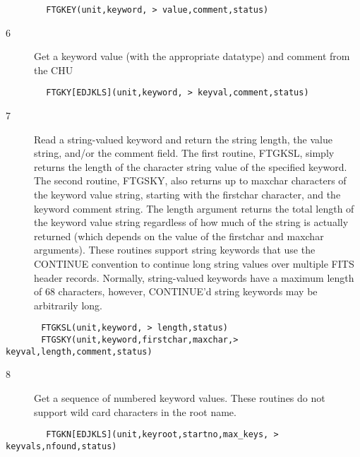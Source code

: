 \documentclass[11pt]{book}
\begin{document}
\begin{verbatim}
        FTGKEY(unit,keyword, > value,comment,status)
\end{verbatim}

\begin{description}
\item[6 ] Get a keyword value (with the appropriate datatype) and comment from
   the CHU
\end{description}

\begin{verbatim}
        FTGKY[EDJKLS](unit,keyword, > keyval,comment,status)
\end{verbatim}

\begin{description}
\item[7 ] Read a string-valued keyword and return the string length, the value string,
    and/or the comment field. The first routine, FTGKSL, simply
    returns the length of the character string value of the specified keyword.
    The second routine, FTGSKY, also returns up to maxchar characters
    of the keyword value string, starting with the firstchar character,
    and the keyword comment string.
    The length argument returns the total length of the keyword value string
    regardless of how much of the string is actually returned (which
    depends on the value of the firstchar and maxchar arguments).  These
    routines support string keywords that use the CONTINUE convention to
    continue long string values over multiple FITS header records.  Normally,
    string-valued keywords have a maximum length of 68 characters, however,
   CONTINUE'd string keywords may be arbitrarily long.
\end{description}

\begin{verbatim}
       FTGKSL(unit,keyword, > length,status)
       FTGSKY(unit,keyword,firstchar,maxchar,> keyval,length,comment,status)
\end{verbatim}

\begin{description}
\item[8 ] Get a sequence of numbered keyword values.  These
   routines do not support wild card characters in the root name.
\end{description}

\begin{verbatim}
        FTGKN[EDJKLS](unit,keyroot,startno,max_keys, > keyvals,nfound,status)
\end{verbatim}
\end{document}
